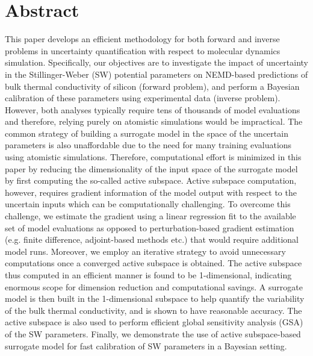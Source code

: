\section*{Abstract}
This paper develops an efficient methodology for both forward and inverse 
problems in uncertainty quantification with respect to molecular dynamics simulation.
Specifically, our objectives are to investigate the impact of uncertainty in the
Stillinger-Weber (SW) potential parameters on NEMD-based predictions of bulk
thermal conductivity of silicon (forward problem), and perform a Bayesian calibration
of these parameters using experimental data (inverse problem). 
However, both analyses typically require tens of thousands of model evaluations
and therefore, relying purely on atomistic simulations would be impractical.
The common strategy of building a surrogate model in the space of the uncertain
parameters is also unaffordable due to the need for many training evaluations
using atomistic simulations. Therefore, computational effort 
is minimized in this paper by reducing the
dimensionality of the input space of the surrogate model by first computing
the so-called active subspace.
Active subspace computation, however, requires gradient information of
the model output with respect to the uncertain inputs which can be
computationally challenging. To overcome this challenge, we estimate the
gradient using a linear regression fit to the available set of
model evaluations as opposed to perturbation-based gradient estimation
(e.g. finite difference, adjoint-based methods etc.) 
that would require additional model runs. Moreover, 
we employ an iterative strategy to avoid unnecessary computations once
a converged active subspace is obtained.
The active subspace thus computed in an efficient manner is found to be
1-dimensional, indicating enormous scope for dimension reduction and
computational savings. A surrogate model is 
then built in the 1-dimensional subspace to help quantify
the variability of the bulk thermal conductivity, and is shown to have
reasonable accuracy. The
active subspace is also used to perform efficient global sensitivity analysis (GSA)
of the SW parameters. Finally, we demonstrate the use of active subspace-based
surrogate model for fast calibration of SW parameters in a Bayesian setting.  
